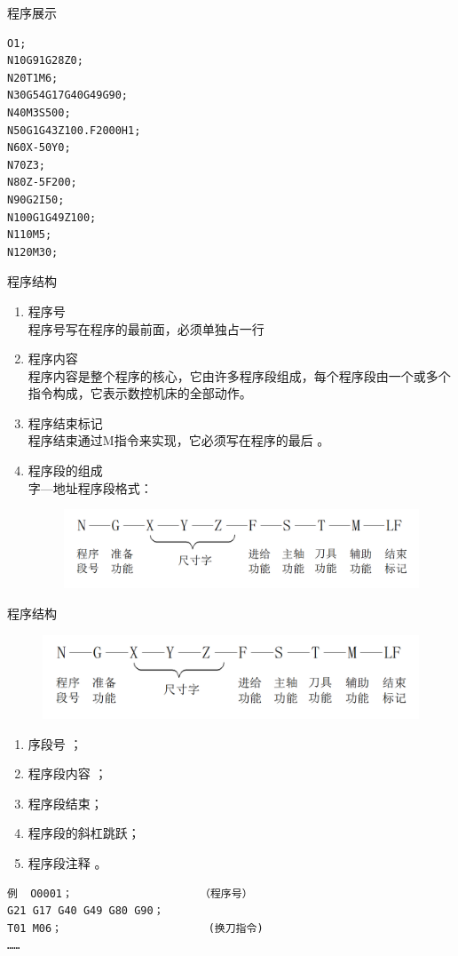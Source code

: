 \documentclass[UTF8,zihao=-4]{ctexbeamer}
\begin{document}
\begin{frame}[fragile]{程序展示}
\begin{lstlisting}
O1;
N10G91G28Z0;
N20T1M6;
N30G54G17G40G49G90;
N40M3S500;
N50G1G43Z100.F2000H1;
N60X-50Y0;
N70Z3;
N80Z-5F200;
N90G2I50;
N100G1G49Z100;
N110M5;
N120M30;
\end{lstlisting}
\end{frame}

\begin{frame} {程序结构}
\begin{enumerate} 
    \item 程序号\\
    程序号写在程序的最前面，必须单独占一行
	\item 程序内容\\程序内容是整个程序的核心，它由许多程序段组成，每个程序段由一个或多个指令构成，它表示数控机床的全部动作。
	\item 程序结束标记 \\程序结束通过M指令来实现，它必须写在程序的最后   。
    \item 程序段的组成\\
    字—地址程序段格式：
    
    \begin{figure}
        \centering
        \includegraphics[width= \linewidth]{image/1-25}
    \end{figure}
    
\end{enumerate}
\end{frame}

\begin{frame}[fragile] {程序结构}
         \begin{figure}
       \centering
       \includegraphics[width= \linewidth]{image/1-25}
   \end{figure}
    \begin{enumerate} 
        \item 序段号  ；
        \item 程序段内容 ；
        \item 程序段结束；
        \item 程序段的斜杠跳跃；
        \item 程序段注释 。     
    \end{enumerate}
\begin{lstlisting}
例  O0001；                    （程序号）
G21 G17 G40 G49 G80 G90；
T01 M06；                       (换刀指令)
……
\end{lstlisting}
\end{frame}
\end{document}
